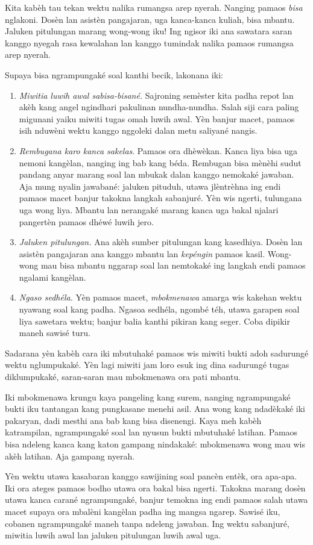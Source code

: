 \documentclass[../../../include/open-logic-section]{subfiles}
\begin{document}


Kita kabèh tau tekan wektu nalika rumangsa arep nyerah.
Nanging pamaos \emph{bisa} nglakoni. Dosèn lan
asistèn pangajaran, uga kanca-kanca kuliah, bisa
mbantu. Jaluken pitulungan marang wong-wong iku!{}
Ing ngisor iki ana sawatara saran kanggo nyegah
rasa kewalahan lan kanggo tumindak nalika
pamaos rumangsa arep nyerah.

Supaya bisa ngrampungaké soal kanthi becik,
lakonana iki:
\begin{enumerate}
\item \emph{Miwitia luwih awal sabisa-bisané.} Sajroning semèster
  kita padha repot lan akèh kang angel ngindhari
  pakulinan nundha-nundha. Salah siji cara paling
  migunani yaiku miwiti tugas omah luwih awal.
  Yèn banjur macet, pamaos isih nduwèni
  wektu kanggo nggoleki dalan metu saliyané nangis.
\item \emph{Rembugana karo kanca sakelas}. Pamaos
  ora dhèwèkan. Kanca liya bisa uga nemoni
  kangèlan, nanging ing bab kang béda. Rembugan
  bisa mènèhi sudut pandang anyar marang soal lan
  mbukak dalan kanggo nemokaké jawaban.
  Aja mung nyalin jawabané: jaluken pituduh,
  utawa jlèntrèhna ing endi pamaos macet
  banjur takokna langkah sabanjuré. Yèn wis
  ngerti, tulungana uga wong liya. Mbantu lan
  nerangaké marang kanca uga bakal njalari
  pangertèn pamaos dhéwé luwih jero.
\item \emph{Jaluken pitulungan.} Ana akèh sumber
  pitulungan kang kasedhiya. Dosèn lan asistèn
  pangajaran ana kanggo mbantu lan \emph{kepéngin}
  pamaos kasil. Wong-wong mau bisa mbantu
  nggarap soal lan nemtokaké ing langkah endi
  pamaos ngalami kangèlan.
\item \emph{Ngaso sedhéla.} Yèn pamaos macet,
  \emph{mbokmenawa} amarga wis kakehan wektu nyawang
  soal kang padha. Ngasoa sedhéla, ngombé téh,
  utawa garapen soal liya sawetara wektu;
  banjur balia kanthi pikiran kang seger.
  Coba dipikir maneh sawisé turu.
\end{enumerate}

Sadarana yèn kabèh cara iki mbutuhaké
pamaos wis miwiti bukti adoh sadurungé
wektu nglumpukaké. Yèn lagi miwiti jam loro
esuk ing dina sadurungé tugas diklumpukaké,
saran-saran mau mbokmenawa ora pati mbantu.

Iki mbokmenawa krungu kaya pangeling kang
surem, nanging ngrampungaké bukti iku
tantangan kang pungkasane menehi asil.
Ana wong kang ndadèkaké iki pakaryan,
dadi mesthi ana bab kang bisa disenengi.
Kaya meh kabèh katrampilan, ngrampungaké
soal lan nyusun bukti mbutuhaké latihan.
Pamaos bisa ndeleng kanca kang katon
gampang nindakaké: mbokmenawa wong mau
wis akèh latihan. Aja gampang nyerah.

Yèn wektu utawa kasabaran kanggo sawijining
soal pancèn entèk, ora apa-apa. Iki ora ateges
pamaos bodho utawa ora bakal bisa ngerti.
Takokna marang dosèn utawa kanca carané
ngrampungaké, banjur temokna ing endi
pamaos salah utawa macet supaya ora
mbalèni kangèlan padha ing mangsa ngarep.
Sawisé iku, cobanen ngrampungaké maneh
tanpa ndeleng jawaban. Ing wektu sabanjuré,
miwitia luwih awal lan jaluken pitulungan
luwih awal uga.
\end{document}
